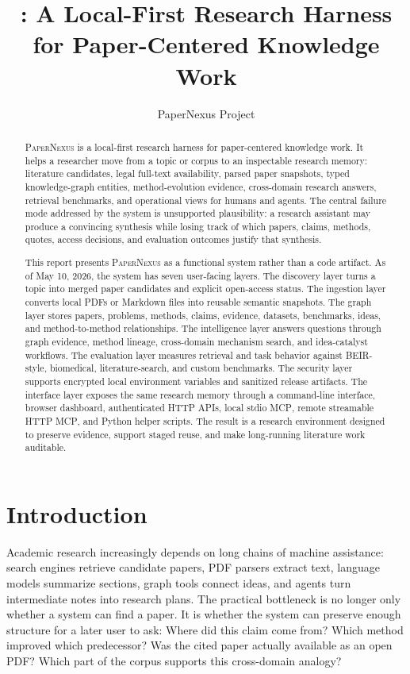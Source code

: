 \documentclass[11pt]{article}
\title{\papernexus: A Local-First Research Harness for Paper-Centered Knowledge Work}
\author{
  PaperNexus Project
}
\date{}
\newcommand{\papernexus}{\textsc{PaperNexus}}
\newcommand{\mcp}{\textsc{MCP}}
\begin{document}
\maketitle

\begin{abstract}
\papernexus{} is a local-first research harness for paper-centered knowledge work. It helps a researcher move from a topic or corpus to an inspectable research memory: literature candidates, legal full-text availability, parsed paper snapshots, typed knowledge-graph entities, method-evolution evidence, cross-domain research answers, retrieval benchmarks, and operational views for humans and agents. The central failure mode addressed by the system is unsupported plausibility: a research assistant may produce a convincing synthesis while losing track of which papers, claims, methods, quotes, access decisions, and evaluation outcomes justify that synthesis.

This report presents \papernexus{} as a functional system rather than a code artifact. As of May 10, 2026, the system has seven user-facing layers. The discovery layer turns a topic into merged paper candidates and explicit open-access status. The ingestion layer converts local PDFs or Markdown files into reusable semantic snapshots. The graph layer stores papers, problems, methods, claims, evidence, datasets, benchmarks, ideas, and method-to-method relationships. The intelligence layer answers questions through graph evidence, method lineage, cross-domain mechanism search, and idea-catalyst workflows. The evaluation layer measures retrieval and task behavior against BEIR-style, biomedical, literature-search, and custom benchmarks. The security layer supports encrypted local environment variables and sanitized release artifacts. The interface layer exposes the same research memory through a command-line interface, browser dashboard, authenticated HTTP APIs, local stdio \mcp{}, remote streamable HTTP \mcp{}, and Python helper scripts. The result is a research environment designed to preserve evidence, support staged reuse, and make long-running literature work auditable.
\end{abstract}

\section{Introduction}

Academic research increasingly depends on long chains of machine assistance: search engines retrieve candidate papers, PDF parsers extract text, language models summarize sections, graph tools connect ideas, and agents turn intermediate notes into research plans. The practical bottleneck is no longer only whether a system can find a paper. It is whether the system can preserve enough structure for a later user to ask: Where did this claim come from? Which method improved which predecessor? Was the cited paper actually available as an open PDF? Which part of the corpus supports this cross-domain analogy?
\end{document}
